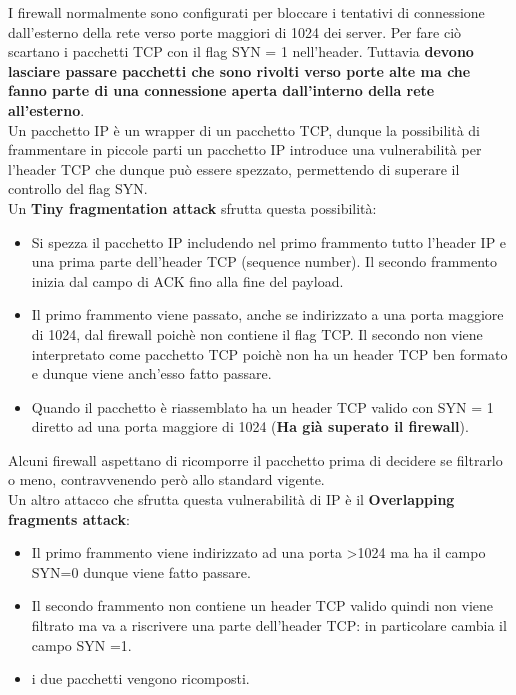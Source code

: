 \documentclass[12pt]{article}
\begin{document}
				I firewall normalmente sono configurati per bloccare i tentativi di connessione dall'esterno della rete verso porte maggiori di 1024 dei server. Per fare ciò scartano i pacchetti TCP con il flag SYN = 1 nell'header. Tuttavia \textbf{devono lasciare passare pacchetti che sono rivolti verso porte alte ma che fanno parte di una connessione aperta dall'interno della rete all'esterno}.\\
				Un pacchetto IP è un wrapper di un pacchetto TCP, dunque la possibilità di frammentare in piccole parti un pacchetto IP introduce una vulnerabilità per l'header TCP che dunque può essere spezzato, permettendo di superare il controllo del flag SYN.\\
				Un \textbf{Tiny fragmentation attack} sfrutta questa possibilità:
				\begin{itemize}
					\item Si spezza il pacchetto IP includendo nel primo frammento tutto l'header IP e una prima parte dell'header TCP (sequence number). Il secondo frammento inizia dal campo di ACK fino alla fine del payload.
					\item Il primo frammento viene passato, anche se indirizzato a una porta maggiore di 1024, dal firewall poichè non contiene il flag TCP. Il secondo non viene interpretato come pacchetto TCP poichè non ha un header TCP ben formato e dunque viene anch'esso fatto passare.
					\item Quando il pacchetto è riassemblato ha un header TCP valido con SYN = 1 diretto ad una porta maggiore di 1024 (\textbf{Ha già superato il firewall}).
				\end{itemize}
				Alcuni firewall aspettano di ricomporre il pacchetto prima di decidere se filtrarlo o meno, contravvenendo però allo standard vigente.\\
				Un altro attacco che sfrutta questa vulnerabilità di IP è il \textbf{Overlapping fragments attack}: 
				\begin{itemize}
					\item Il primo frammento viene indirizzato ad una porta >1024 ma ha il campo SYN=0 dunque viene fatto passare.
					\item Il secondo frammento non contiene un header TCP valido quindi non viene filtrato ma va a riscrivere una parte dell'header TCP: in particolare cambia il campo SYN =1.
					\item i due pacchetti vengono ricomposti.
				\end{itemize}
\end{document}
